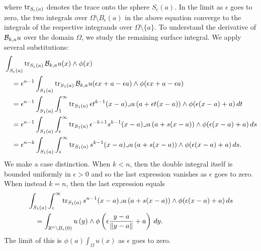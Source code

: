 \documentclass[10pt,a4paper]{article}
\begin{document}
where $\operatorname{tr}_{S_{\epsilon}(a)}$ denotes the trace onto the sphere $S_{\epsilon}(a)$. 
In the limit as $\epsilon$ goes to zero, the two integrals over $\Omega \setminus B_\epsilon(a)$ in the above equation converge to the integrals of the respective integrands over $\Omega \setminus \{a\}$. 
To understand the derivative of ${\mathcal B}_{k,a} u$ over the domain $\Omega$, 
we study the remaining surface integral. 
We apply several substitutions:
\begin{align*}
    &\int_{ S_\epsilon(a) }
    \operatorname{tr}_{S_\epsilon(a)}{ {\mathcal B}_{k,a} u(x) \wedge \phi(x) } 
    \\&\quad 
    =
    \epsilon^{n-1}
    \int_{ S_1(a) }
    \operatorname{tr}_{S_1(a)}{ {\mathcal B}_{k,a} u( \epsilon x + a - \epsilon a ) \wedge \phi( \epsilon x + a - \epsilon a ) }
    \\&\quad 
    =
    \epsilon^{n-1}
    \int_{ S_1(a) }
    \int_{1}^\infty 
    \operatorname{tr}_{S_1(a)}{ 
        \epsilon t^{k-1} (x-a)\lrcorner u\left( a + \epsilon t( x - a )\right) 
        \wedge \phi( \epsilon (x-a) + a ) 
    }
    \,dt 
    \\&\quad 
    =
    \epsilon^{n-1}
    \int_{ S_1(a) }
    \int_{\epsilon}^\infty 
    \operatorname{tr}_{S_1(a)}{ 
        \epsilon^{-k+1} s^{k-1} (x-a)\lrcorner u\left( a + s( x - a )\right) 
        \wedge \phi( \epsilon (x-a) + a ) 
    }
    \,ds 
    \\&\quad 
    =
    \epsilon^{n-k}
    \int_{ S_1(a) }
    \int_{\epsilon}^\infty 
    \operatorname{tr}_{S_1(a)}{ 
        s^{k-1} (x-a)\lrcorner u\left( a + s( x - a )\right) 
        \wedge \phi( \epsilon (x-a) + a ) 
    }
    \,ds 
    .
\end{align*}
We make a case distinction. When $k<n$, then the double integral itself is bounded uniformly in $\epsilon > 0$ and so the last expression vanishes as $\epsilon$ goes to zero. When instead $k=n$, then the last expression equals 
\begin{align*}
    & 
    \int_{ S_1(a) }
    \int_{\epsilon}^\infty 
    \operatorname{tr}_{S_1(a)}{ 
        s^{n-1} (x-a)\lrcorner u\left( a + s( x - a )\right) 
        \wedge \phi( \epsilon (x-a) + a ) 
    }
    \,ds 
    \\&\quad 
    =
    \int_{{\mathbb R}^{n} \setminus B_{\epsilon}(0)}
        u\left( y \right) 
        \wedge \phi\left( \epsilon \frac{y-a}{ \| y-a \| } + a \right) 
    \,dy 
    .
\end{align*}
The limit of this is $\phi(a) \int_\Omega u(x)$ as $\epsilon$ goes to zero. 
\end{document}
